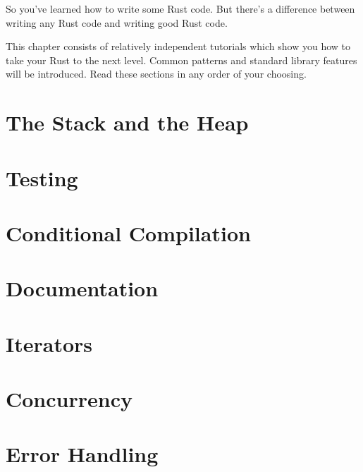 So you've learned how to write some Rust code. But there's a difference between writing any Rust code and writing good Rust code.

\blank

This chapter consists of relatively independent tutorials which show you how to take your Rust to the next level. Common patterns 
and standard library features will be introduced. Read these sections in any order of your choosing.

\section{The Stack and the Heap}
\label{sec:effective_stackAndHeap}


\section{Testing}
\label{sec:effective_testing}


\section{Conditional Compilation}
\label{sec:effective_conditionalCompilation}


\section{Documentation}
\label{sec:effective_documentation}


\section{Iterators}
\label{sec:effective_iterators}


\section{Concurrency}
\label{sec:effective_concurrency}


\section{Error Handling}
\label{sec:effective_errorHandling}


